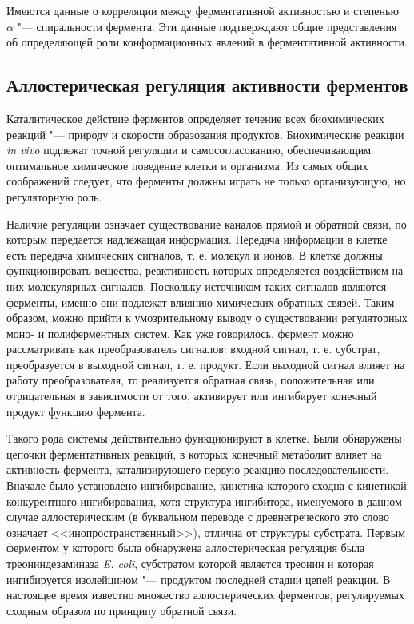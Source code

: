 \documentclass[12pt,a4paper,oneside]{book}
\begin{document}
Имеются данные о корреляции между ферментативной активностью и степенью $ \alpha $ "--- спиральности фермента. Эти данные подтверждают общие представления об определяющей роли конформационных явлений в ферментативной активности.  

\subsection{Аллостерическая регуляция активности ферментов}


Каталитическое действие ферментов определяет течение всех биохимических реакций "--- природу и скорости образования продуктов. Биохимические реакции \textit{in vivo} подлежат точной регуляции и самосогласованию, обеспечивающим оптимальное химическое поведение клетки и организма. Из самых общих соображений следует, что ферменты должны играть не только организующую, но регуляторную роль.

Наличие регуляции означает существование каналов прямой и обратной связи, по которым передается надлежащая информация. Передача информации в клетке есть передача химических сигналов, т. е. молекул и ионов. В клетке должны функционировать вещества, реактивность которых определяется воздействием на них молекулярных сигналов. Поскольку источником таких сигналов являются ферменты, именно они подлежат влиянию химических обратных связей. Таким образом, можно прийти к умозрительному выводу о существовании регуляторных моно- и полиферментных систем. Как уже говорилось, фермент можно рассматривать как преобразователь сигналов: входной сигнал, т. е. субстрат, преобразуется в выходной сигнал, т. е. продукт. Если выходной сигнал влияет на работу преобразователя, то реализуется обратная связь, положительная или отрицательная в зависимости от того, активирует или ингибирует конечный продукт функцию фермента.

Такого рода системы действительно функционируют в клетке. Были обнаружены цепочки ферментативных реакций, в которых конечный метаболит влияет на активность фермента, катализирующего первую реакцию последовательности. Вначале было установлено ингибирование, кинетика которого сходна с кинетикой конкурентного ингибирования, хотя структура ингибитора, именуемого в данном случае аллостерическим (в буквальном переводе с древнегреческого это слово означает <<инопространственный>>), отлична от структуры субстрата. Первым ферментом у которого была обнаружена аллостерическая регуляция была треониндезаминаза \textit{E. coli}, субстратом которой является треонин и которая ингибируется изолейцином "--- продуктом последней стадии цепей реакции. В настоящее время известно множество аллостерических ферментов, регулируемых сходным образом по принципу обратной связи. 
\end{document}
